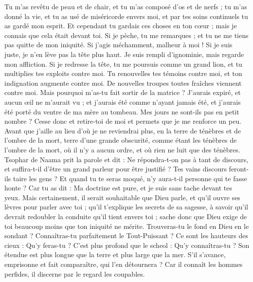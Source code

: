 \begin{multicols}{2}
Tu m'as revêtu de peau et de chair, et tu m'as composé d'os et de nerfs ;
tu m'as donné la vie, et tu as usé de miséricorde envers moi, et par tes soins continuels tu as gardé mon esprit.
Et cependant tu gardais ces choses en ton cœur ; mais je connais que cela était devant toi. 
Si je pèche, tu me remarques ; et tu ne me tiens pas quitte de mon iniquité.
Si j'agis méchamment, malheur à moi ! Si je suis juste, je n'en lève pas la tête plus haut. Je suis rempli d'ignominie, mais regarde mon affliction. 
Si je redresse la tête, tu me poursuis comme un grand lion, et tu multiplies tes exploits contre moi.
Tu renouvelles tes témoins contre moi, et ton indignation augmente contre moi. De nouvelles troupes toutes fraîches viennent contre moi.
Mais pourquoi m'as-tu fait sortir de la matrice ? J'aurais expiré, et aucun œil ne m'aurait vu ;
et j'aurais été comme n'ayant jamais été, et j'aurais été porté du ventre de ma mère au tombeau.
Mes jours ne sont-ils pas en petit nombre ? Cesse donc et retire-toi de moi et permets que je me renforce un peu.
Avant que j'aille au lieu d'où je ne reviendrai plus, en la terre de ténèbres et de l'ombre de la mort,
terre d'une grande obscurité, comme étant les ténèbres de l'ombre de la mort, où il n'y a aucun ordre, et où rien ne luit que des ténèbres. 
\VerseOne{}Tsophar de Naama prit la parole et dit :
Ne répondra-t-on pas à tant de discours, et suffira-t-il d'être un grand parleur pour être justifié ?
Tes vains discours feront-ils taire les gens ? Et quand tu te seras moqué, n'y aura-t-il personne qui te fasse honte ?
Car tu as dit : Ma doctrine est pure, et je suis sans tache devant tes yeux. 
Mais certainement, il serait souhaitable que Dieu parle, et qu'il ouvre ses lèvres pour parler avec toi ;
qu'il t'explique les secrets de sa sagesse, à savoir qu'il devrait redoubler la conduite qu'il tient envers toi ; sache donc que Dieu exige de toi beaucoup moins que ton iniquité ne mérite.
Trouveras-tu le fond en Dieu en le sondant ? Connaîtras-tu parfaitement le Tout-Puissant ? 
Ce sont les hauteurs des cieux : Qu'y feras-tu ? C'est plus profond que le scheol : Qu'y connaîtras-tu ?
Son étendue est plus longue que la terre et plus large que la mer.
S'il s'avance, emprisonne et fait comparaître, qui l'en détournera ?
Car il connaît les hommes perfides, il discerne par le regard les coupables.

\end{multicols}
